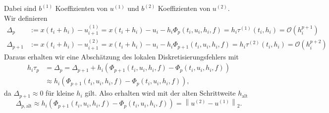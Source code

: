 Dabei sind $b^{(1)}$ Koeffizienten von $u^{(1)}$ und $b^{(2)}$ Koeffizienten von $u^{(2)}$.\\
Wir definieren
\begin{align*}
    \Delta_{p} &:= x(t_i + h_i) - u^{(1)}_{i+1}
    = x(t_i + h_i) - u_i - h_i \Phi_{p}(t_i,u_i,h_i,f)= h_i\tau^{(1)}(t_i,h_i) = \mathcal{O}(h_i^{p+1})\\
    \Delta_{p+1} &:= x(t_i + h_i) - u^{(2)}_{i+1}
    = x(t_i + h_i) - u_i - h_i \Phi_{p+1}(t_i,u_i,h_i,f)= h_i\tau^{(2)}(t_i,h_i)= \mathcal{O}(h_i^{p+2})
\end{align*}
Daraus erhalten wir eine Abschätzung des lokalen Diskretisierungsfehlers mit
\begin{align*}
    h_i\tau_{p} &= \Delta_{p} = \Delta_{p+1} + h_i(\Phi_{p+1}(t_i,u_i,h_i,f) - \Phi_{p}(t_i,u_i,h_i,f)) \\
    &\approx h_i(\Phi_{p+1}(t_i,u_i,h_i,f) - \Phi_{p}(t_i,u_i,h_i,f)),
\end{align*}
da $\Delta_{p+1} \approx 0$ für kleine $h_i$ gilt. Also erhalten wird mit der alten Schrittweite $h_{\text{alt}}$
\[
    \Delta_{p, \text{alt}} \approx h_i(\Phi_{p+1}(t_i,u_i,h_i,f) - \Phi_{p}(t_i,u_i,h_i,f))
    = \left\lVert u^{(2)} - u^{(1)} \right\rVert_2.
\]

